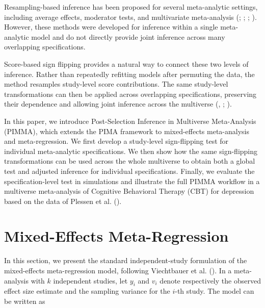 \documentclass[
  man,
  longtable,
  nolmodern,
  notxfonts,
  notimes,
  colorlinks=true,linkcolor=blue,citecolor=blue,urlcolor=blue]{apa7}
\begin{document}
Resampling-based inference has been proposed for several meta-analytic
settings, including average effects, moderator tests, and multivariate
meta-analysis (; ;
;
). However,
these methods were developed for inference within a single meta-analytic
model and do not directly provide joint inference across many
overlapping specifications.

Score-based sign flipping provides a natural way to connect these two
levels of inference. Rather than repeatedly refitting models after
permuting the data, the method resamples study-level score
contributions. The same study-level transformations can then be applied
across overlapping specifications, preserving their dependence and
allowing joint inference across the multiverse
(,
;
).

In this paper, we introduce Post-Selection Inference in Multiverse
Meta-Analysis (PIMMA), which extends the PIMA framework to mixed-effects
meta-analysis and meta-regression. We first develop a study-level
sign-flipping test for individual meta-analytic specifications. We then
show how the same sign-flipping transformations can be used across the
whole multiverse to obtain both a global test and adjusted inference for
individual specifications. Finally, we evaluate the specification-level
test in simulations and illustrate the full PIMMA workflow in a
multiverse meta-analysis of Cognitive Behavioral Therapy (CBT) for
depression based on the data of Plessen et al.
().

\section{Mixed-Effects
Meta-Regression}\label{mixed-effects-meta-regression}

In this section, we present the standard independent-study formulation
of the mixed-effects meta-regression model, following Viechtbauer et al.
(). In a meta-analysis with \(k\)
independent studies, let \(y_i\) and \(v_i\) denote respectively the
observed effect size estimate and the sampling variance for the \(i\)-th
study. The model can be written as
\end{document}
